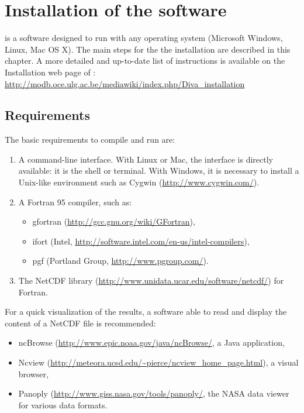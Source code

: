 \chapter{Installation of the software}

\diva is a software designed to run with any operating system (Microsoft Windows, Linux, Mac OS X). The main steps for the the installation are described in this chapter. A more detailed and up-to-date list of instructions is available on the Installation web page of \diva: \url{http://modb.oce.ulg.ac.be/mediawiki/index.php/Diva_installation}


\minitoc

\newpage

\section{Requirements}

The basic requirements to compile and run \diva are:
\begin{enumerate}
\item A command-line interface. With Linux or Mac, the interface is directly available: it is the shell or terminal. With Windows, it is necessary to install a Unix-like environment such as Cygwin (\url{http://www.cygwin.com/}).
\item A Fortran 95 compiler, such as:
\begin{itemize}
\item gfortran (\url{http://gcc.gnu.org/wiki/GFortran}),
\item ifort (Intel\textsuperscript{\textregistered}, \url{http://software.intel.com/en-us/intel-compilers}),
\item pgf (Portland Group, \url{http://www.pgroup.com/}).
\end{itemize}    
\item The NetCDF library (\url{http://www.unidata.ucar.edu/software/netcdf/}) for Fortran.
\end{enumerate}

For a quick visualization of the results, a software able to read and display the content of a NetCDF  file is recommended:
\begin{itemize}
\item ncBrowse (\url{http://www.epic.noaa.gov/java/ncBrowse/}, a Java application,
\item Ncview (\url{http://meteora.ucsd.edu/~pierce/ncview_home_page.html}), a visual browser, 
\item Panoply (\url{http://www.giss.nasa.gov/tools/panoply/}, the NASA data viewer for various data formats.
\end{itemize}


